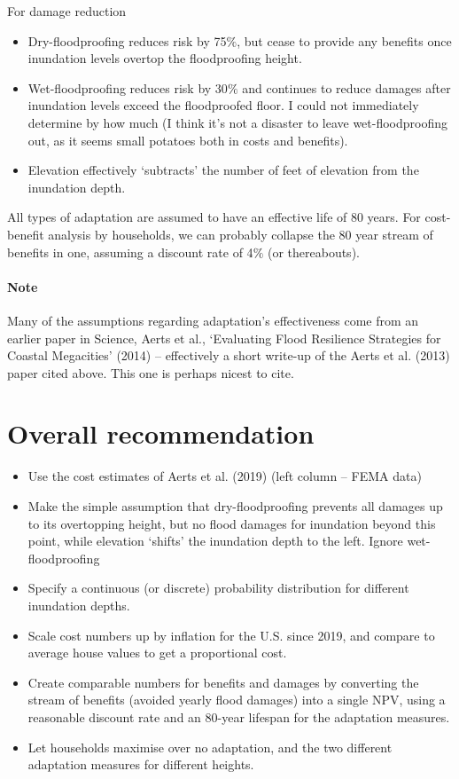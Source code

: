 \documentclass[12pt]{article}
\begin{document}
For damage reduction

\begin{itemize}
\item Dry-floodproofing reduces risk by 75$\%$, but cease to provide any benefits once inundation levels overtop the floodproofing height.
\item Wet-floodproofing reduces risk by 30$\%$ and continues to reduce damages after inundation levels exceed the floodproofed floor. I could not immediately determine by how much (I think it's not a disaster to leave wet-floodproofing out, as it seems small potatoes both in costs and benefits). 
\item Elevation effectively `subtracts' the number of feet of elevation from the inundation depth.
\end{itemize}

All types of adaptation are assumed to have an effective life of 80 years. For cost-benefit analysis by households, we can probably collapse the 80 year stream of benefits in one, assuming a discount rate of 4$\%$ (or thereabouts). 

\paragraph{Note} Many of the assumptions regarding adaptation's effectiveness come from an earlier paper in Science, Aerts et al., `Evaluating Flood Resilience Strategies for Coastal Megacities' (2014) -- effectively a short write-up of the Aerts et al. (2013) paper cited above. This one is perhaps nicest to cite. 

\section*{Overall recommendation}
\begin{itemize}
\item Use the cost estimates of Aerts et al. (2019) (left column -- FEMA data)
\item Make the simple assumption that dry-floodproofing prevents all damages up to its overtopping height, but no flood damages for inundation beyond this point, while elevation `shifts' the inundation depth to the left. Ignore wet-floodproofing
\item Specify a continuous (or discrete) probability distribution for different inundation depths. 
\item Scale cost numbers up by inflation for the U.S. since 2019, and compare to average house values to get a proportional cost.
\item Create comparable numbers for benefits and damages by converting the stream of benefits (avoided yearly flood damages) into a single NPV, using a reasonable discount rate and an 80-year lifespan for the adaptation measures. 
\item Let households maximise over no adaptation, and the two different adaptation measures for different heights.
\end{itemize}
\end{document}
